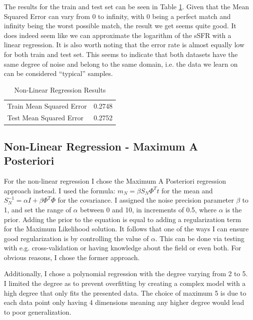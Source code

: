 \documentclass{article}
\theoremstyle{plain}
\theoremstyle{nonumberplain}
\begin{document}
\noindent The results for the train and test set can be seen in Table \ref{table:linear}. 
Given that the Mean Squared Error can vary from 0 to infinity, with 0 being a perfect match and infinity being the worst possible match, the result we get seems quite good. 
It does indeed seem like we can approximate the logarithm of the sSFR with a linear regression. 
It is also worth noting that the error rate is almost equally low for both train and test set.
This seems to indicate that both datasets have the same degree of noise and belong to the same domain, i.e. the data we learn on can be considered ``typical'' samples.  


\begin{table}[htb]
\centering
\caption{Non-Linear Regression Results}
\label{table:linear}
\begin{tabular}{l|c}
	\hline \hline
	Train Mean Squared Error & 0.2748 \\
	Test Mean Squared Error & 0.2752 \\
\end{tabular}
\end{table}

\subsection{Non-Linear Regression - Maximum A Posteriori}

For the non-linear regression I chose the Maximum A Posteriori regression approach instead.
I used the formula:
$m_N = \beta S_N\Phi^T t$ for the mean and $S^{-1}_N = \alpha I + \beta \Phi^T\Phi$ for the covariance.
I assigned the noise precision parameter $\beta$ to 1, and set the range of $\alpha$ between 0 and 10, in increments of 0.5, where $\alpha$ is the prior.
Adding the prior to the equation is equal to adding a regularization term for the Maximum Likelihood solution.
It follows that one of the ways I can ensure good regularization is by controlling the value of $\alpha$.
This can be done via testing with e.g. cross-validation or having knowledge about the field or even both.
For obvious reasons, I chose the former approach.

Additionally, I chose a polynomial regression with the degree varying from 2 to 5. 
I limited the degree as to prevent overfitting by creating a complex model with a high degree that only fits the presented data.
The choice of maximum 5 is due to each data point only having 4 dimensions meaning any higher degree would lead to poor generalization.
\end{document}
